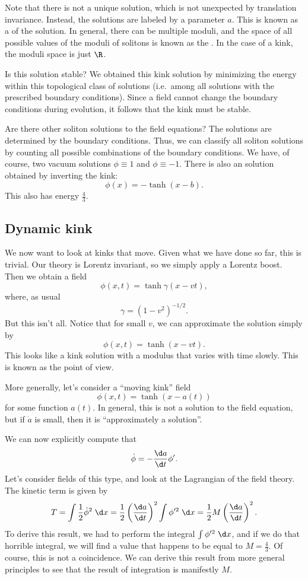 \documentclass[a4paper]{article}
\begin{document}
Note that there is not a unique solution, which is not unexpected by translation invariance. Instead, the solutions are labeled by a parameter $a$. This is known as a  of the solution. In general, there can be multiple moduli, and the space of all possible values of the moduli of solitons is known as the . In the case of a kink, the moduli space is just $\R$.

Is this solution stable? We obtained this kink solution by minimizing the energy within this topological class of solutions (i.e.\ among all solutions with the prescribed boundary conditions). Since a field cannot change the boundary conditions during evolution, it follows that the kink must be stable.

Are there other soliton solutions to the field equations? The solutions are determined by the boundary conditions. Thus, we can classify all soliton solutions by counting all possible combinations of the boundary conditions. We have, of course, two vacuum solutions $\phi \equiv 1$ and $\phi \equiv -1$. There is also an  solution obtained by inverting the kink:
\[
  \phi(x) = - \tanh (x - b).
\]
This also has energy $\frac{4}{3}$.

\subsection{Dynamic kink}
We now want to look at kinks that move. Given what we have done so far, this is trivial. Our theory is Lorentz invariant, so we simply apply a Lorentz boost. Then we obtain a field
\[
  \phi(x, t) = \tanh \gamma (x - vt),
\]
where, as usual
\[
  \gamma = (1 - v^2)^{-1/2}.
\]
But this isn't all. Notice that for small $v$, we can approximate the solution simply by
\[
  \phi(x, t) = \tanh (x - vt).
\]
This looks like a kink solution with a modulus that varies with time slowly. This is known as the  point of view.

More generally, let's consider a ``moving kink'' field
\[
  \phi(x, t) = \tanh (x - a(t))
\]
for some function $a(t)$. In general, this is not a solution to the field equation, but if $\dot{a}$ is small, then it is ``approximately a solution''.

We can now explicitly compute that
\[
  \dot{\phi} = - \frac{\d a}{\d t} \phi'.
\]
Let's consider fields of this type, and look at the Lagrangian of the field theory. The kinetic term is given by
\[
  T = \int \frac{1}{2} \dot{\phi}^2\;\d x = \frac{1}{2} \left(\frac{\d a}{\d t}\right)^2 \int \phi'^2 \;\d x = \frac{1}{2} M \left(\frac{\d a}{\d t}\right)^2.
\]
To derive this result, we had to perform the integral $\int \phi'^2 \;\d x$, and if we do that horrible integral, we will find a value that happens to be equal to $M = \frac{4}{3}$. Of course, this is not a coincidence. We can derive this result from more general principles to see that the result of integration is manifestly $M$.
\end{document}
